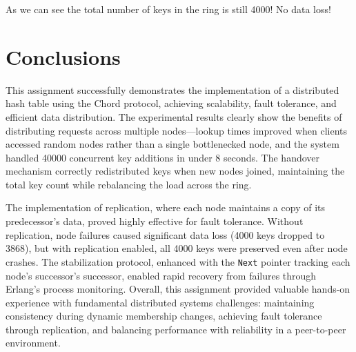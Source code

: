 \documentclass[a4paper, 11pt]{article}
\begin{document}
As we can see the total number of keys in the ring is still 4000! No data loss!

\section{Conclusions}

This assignment successfully demonstrates the implementation of a distributed hash table using the Chord protocol, achieving scalability, fault tolerance, and efficient data distribution. The experimental results clearly show the benefits of distributing requests across multiple nodes—lookup times improved when clients accessed random nodes rather than a single bottlenecked node, and the system handled 40000 concurrent key additions in under 8 seconds. The handover mechanism correctly redistributed keys when new nodes joined, maintaining the total key count while rebalancing the load across the ring.

The implementation of replication, where each node maintains a copy of its predecessor's data, proved highly effective for fault tolerance. Without replication, node failures caused significant data loss (4000 keys dropped to 3868), but with replication enabled, all 4000 keys were preserved even after node crashes. The stabilization protocol, enhanced with the \texttt{Next} pointer tracking each node's successor's successor, enabled rapid recovery from failures through Erlang's process monitoring. Overall, this assignment provided valuable hands-on experience with fundamental distributed systems challenges: maintaining consistency during dynamic membership changes, achieving fault tolerance through replication, and balancing performance with reliability in a peer-to-peer environment.
\end{document}
